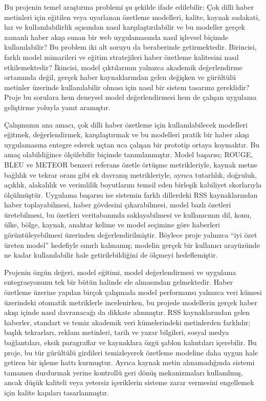 Bu projenin temel araştırma problemi şu şekilde ifade edilebilir: Çok dilli haber metinleri için eğitilen veya uyarlanan özetleme modelleri, kalite, kaynak sadakati, hız ve kullanılabilirlik açısından nasıl karşılaştırılabilir ve bu modeller gerçek zamanlı haber akışı sunan bir web uygulamasında nasıl işlevsel biçimde kullanılabilir? Bu problem iki alt soruyu da beraberinde getirmektedir. Birincisi, farklı model mimarileri ve eğitim stratejileri haber özetleme kalitesini nasıl etkilemektedir? İkincisi, model çıktılarının yalnızca akademik değerlendirme ortamında değil, gerçek haber kaynaklarından gelen değişken ve gürültülü metinler üzerinde kullanılabilir olması için nasıl bir sistem tasarımı gereklidir? Proje bu sorulara hem deneysel model değerlendirmesi hem de çalışan uygulama geliştirme yoluyla yanıt aramıştır.

Çalışmanın ana amacı, çok dilli haber özetleme için kullanılabilecek modelleri eğitmek, değerlendirmek, karşılaştırmak ve bu modelleri pratik bir haber akışı uygulamasına entegre ederek uçtan uca çalışan bir prototip ortaya koymaktır. Bu amaç olabildiğince ölçülebilir biçimde tanımlanmıştır. Model başarısı; ROUGE, BLEU ve METEOR benzeri referans özetle örtüşme metrikleriyle, kaynak metne bağlılık ve tekrar oranı gibi ek davranış metrikleriyle, ayrıca tutarlılık, doğruluk, açıklık, alakalılık ve verimlilik boyutlarını temsil eden birleşik kabiliyet skorlarıyla ölçülmüştür. Uygulama başarısı ise sistemin farklı dillerdeki RSS kaynaklarından haber toplayabilmesi, haber gövdesini çıkarabilmesi, model bazlı özetleri üretebilmesi, bu özetleri veritabanında saklayabilmesi ve kullanıcının dil, konu, ülke, bölge, kaynak, anahtar kelime ve model seçimine göre haberleri görüntüleyebilmesi üzerinden değerlendirilmiştir. Böylece proje yalnızca “iyi özet üreten model” hedefiyle sınırlı kalmamış; modelin gerçek bir kullanıcı arayüzünde ne kadar kullanılabilir hale getirilebildiğini de ölçmeyi hedeflemiştir.

Projenin özgün değeri, model eğitimi, model değerlendirmesi ve uygulama entegrasyonunu tek bir bütün halinde ele almasından gelmektedir. Haber özetleme üzerine yapılan birçok çalışmada model performansı yalnızca veri kümesi üzerindeki otomatik metriklerle incelenirken, bu projede modellerin gerçek haber akışı içinde nasıl davranacağı da dikkate alınmıştır. RSS kaynaklarından gelen haberler, standart ve temiz akademik veri kümelerindeki metinlerden farklıdır; başlık tekrarları, reklam metinleri, tarih ve yazar bilgileri, sosyal medya bağlantıları, eksik paragraflar ve kaynaklara özgü şablon kalıntıları içerebilir. Bu proje, bu tür gürültülü girdileri temizleyerek özetleme modeline daha uygun hale getiren bir işleme hattı kurmuştur. Ayrıca kaynak metin alınamadığında sistemi tamamen durdurmak yerine kontrollü geri dönüş mekanizmaları kullanılmış, ancak düşük kaliteli veya yetersiz içeriklerin sisteme zarar vermesini engellemek için kalite kapıları tasarlanmıştır.

